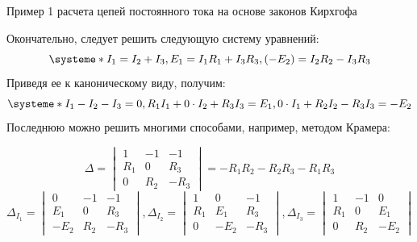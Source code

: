 \documentclass[10pt, pdf, hyperref={unicode},handout]{beamer}
\begin{document}
\begin{frame}{Пример 1  расчета цепей постоянного тока на основе законов Кирхгофа}
  \begin{block}

    \small{
      Окончательно, следует решить следующую систему уравнений:
\[
\systeme*{ I_1=I_2+I_3, E_1=I_1R_1+I_3R_3, (-E_2)=I_2R_2-I_3R_3}
\]
Приведя ее к каноническому виду, получим:
\[
\systeme*{I_1-I_2-I_3=0, R_1I_1+0\cdot I_2+R_3I_3=E_1, 0\cdot I_1+R_2I_2-R_3I_3=-E_2}
\]
Последнюю можно решить многими способами, например, методом Крамера:

\begin{equation*} \Delta=\begin{vmatrix} 1 & -1 & -1 \\ R_1 & 0 & R_3 \\ 0 &  R_2 &  -R_3 \end{vmatrix}=-R_1R_2-R_2R_3-R_1R_3\end{equation*}
\begin{equation*} \Delta_{I_1}=\begin{vmatrix} 0 & -1 & -1 \\ E_1 & 0 & R_3 \\ -E_2 &  R_2 &  -R_3 \end{vmatrix}, \Delta_{I_2}=\begin{vmatrix} 1 & 0 & -1 \\ R_1 & E_1 & R_3 \\ 0 &  -E_2 &  -R_3 \end{vmatrix}, \Delta_{I_3}=\begin{vmatrix} 1 & -1 & 0 \\ R_1 & 0 & E_1 \\ 0 &  R_2 &  -E_2 \end{vmatrix}\end{equation*}

}

  \end{block}
  
\end{frame}
\end{document}
